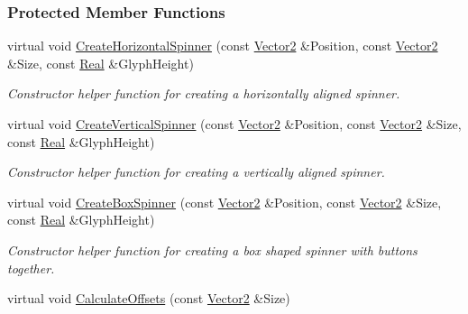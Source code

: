 \subsubsection*{Protected Member Functions}
\begin{DoxyCompactItemize}
\item 
\hypertarget{classphys_1_1UI_1_1Spinner_a74fd8b5185cae46beef77599fe6ef44f}{
virtual void \hyperlink{classphys_1_1UI_1_1Spinner_a74fd8b5185cae46beef77599fe6ef44f}{CreateHorizontalSpinner} (const \hyperlink{classphys_1_1Vector2}{Vector2} \&Position, const \hyperlink{classphys_1_1Vector2}{Vector2} \&Size, const \hyperlink{namespacephys_af7eb897198d265b8e868f45240230d5f}{Real} \&GlyphHeight)}
\label{d7/d81/classphys_1_1UI_1_1Spinner_a74fd8b5185cae46beef77599fe6ef44f}

\begin{DoxyCompactList}\small\item\em Constructor helper function for creating a horizontally aligned spinner. \item\end{DoxyCompactList}\item 
\hypertarget{classphys_1_1UI_1_1Spinner_aea2fe91287c9757abb6758a9b0c129cb}{
virtual void \hyperlink{classphys_1_1UI_1_1Spinner_aea2fe91287c9757abb6758a9b0c129cb}{CreateVerticalSpinner} (const \hyperlink{classphys_1_1Vector2}{Vector2} \&Position, const \hyperlink{classphys_1_1Vector2}{Vector2} \&Size, const \hyperlink{namespacephys_af7eb897198d265b8e868f45240230d5f}{Real} \&GlyphHeight)}
\label{d7/d81/classphys_1_1UI_1_1Spinner_aea2fe91287c9757abb6758a9b0c129cb}

\begin{DoxyCompactList}\small\item\em Constructor helper function for creating a vertically aligned spinner. \item\end{DoxyCompactList}\item 
\hypertarget{classphys_1_1UI_1_1Spinner_aeca447d00d7165acb9f6f4cd253607e5}{
virtual void \hyperlink{classphys_1_1UI_1_1Spinner_aeca447d00d7165acb9f6f4cd253607e5}{CreateBoxSpinner} (const \hyperlink{classphys_1_1Vector2}{Vector2} \&Position, const \hyperlink{classphys_1_1Vector2}{Vector2} \&Size, const \hyperlink{namespacephys_af7eb897198d265b8e868f45240230d5f}{Real} \&GlyphHeight)}
\label{d7/d81/classphys_1_1UI_1_1Spinner_aeca447d00d7165acb9f6f4cd253607e5}

\begin{DoxyCompactList}\small\item\em Constructor helper function for creating a box shaped spinner with buttons together. \item\end{DoxyCompactList}\item 
\hypertarget{classphys_1_1UI_1_1Spinner_abbbdba70d318c15564e120136d472ae9}{
virtual void \hyperlink{classphys_1_1UI_1_1Spinner_abbbdba70d318c15564e120136d472ae9}{CalculateOffsets} (const \hyperlink{classphys_1_1Vector2}{Vector2} \&Size)}
\label{d7/d81/classphys_1_1UI_1_1Spinner_abbbdba70d318c15564e120136d472ae9}


\end{DoxyCompactItemize}

